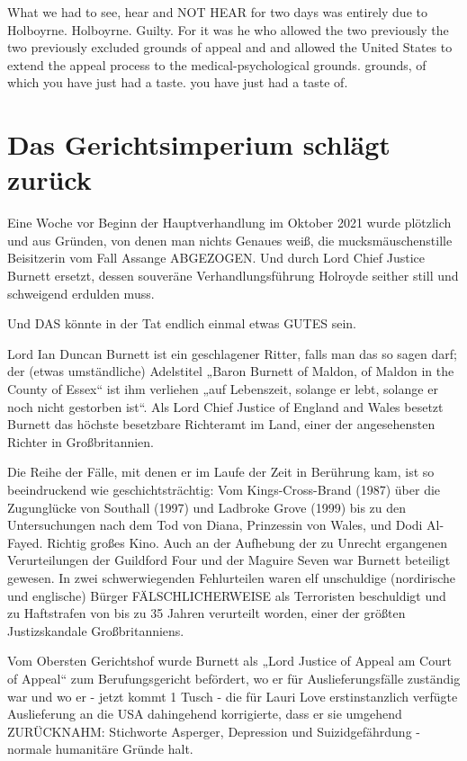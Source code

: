 \begin{multicols}{2}
What we had to see, hear and NOT HEAR for two days was entirely due to Holboyrne.
Holboyrne. Guilty. For it was he who allowed the two previously
the two previously excluded grounds of appeal and
and allowed the United States to extend the appeal process to the medical-psychological grounds.
grounds, of which you have just had a taste.
you have just had a taste of.


\chapter{Das Gerichtsimperium schlägt zurück}
Eine Woche vor Beginn der Hauptverhandlung im Oktober 2021 wurde plötzlich und aus Gründen, von denen
man nichts Genaues weiß, die mucksmäuschenstille
Beisitzerin vom Fall Assange ABGEZOGEN. Und durch
Lord Chief Justice Burnett ersetzt, dessen souveräne Verhandlungsführung Holroyde seither still und schweigend erdulden muss.

Und DAS könnte in der Tat endlich einmal etwas GUTES
sein.

Lord Ian Duncan Burnett ist ein geschlagener Ritter, falls
man das so sagen darf; der (etwas umständliche) Adelstitel „Baron Burnett of Maldon, of Maldon in the County of Essex“ ist ihm verliehen „auf Lebenszeit, solange
er lebt, solange er noch nicht gestorben ist“. Als Lord
Chief Justice of England and Wales besetzt Burnett das
höchste besetzbare Richteramt im Land, einer der angesehensten Richter in Großbritannien.

Die Reihe der Fälle, mit denen er im Laufe der Zeit in
Berührung kam, ist so beeindruckend wie geschichtsträchtig: Vom Kings-Cross-Brand (1987) über die Zugunglücke von Southall (1997) und Ladbroke Grove (1999)
bis zu den Untersuchungen nach dem Tod von Diana,
Prinzessin von Wales, und Dodi Al-Fayed. Richtig großes
Kino. Auch an der Aufhebung der zu Unrecht ergangenen Verurteilungen der Guildford Four und der Maguire
Seven war Burnett beteiligt gewesen. In zwei schwerwiegenden Fehlurteilen waren elf unschuldige (nordirische
und englische) Bürger FÄLSCHLICHERWEISE als Terroristen beschuldigt und zu Haftstrafen von bis zu 35 Jahren verurteilt worden, einer der größten Justizskandale
Großbritanniens.

Vom Obersten Gerichtshof wurde Burnett als „Lord Justice of Appeal am Court of Appeal“ zum Berufungsgericht
befördert, wo er für Auslieferungsfälle zuständig war
und wo er - jetzt kommt 1 Tusch - die für Lauri Love erstinstanzlich verfügte Auslieferung an die USA dahingehend korrigierte, dass er sie umgehend ZURÜCKNAHM:
Stichworte Asperger, Depression und Suizidgefährdung
- normale humanitäre Gründe halt.


\end{multicols}
